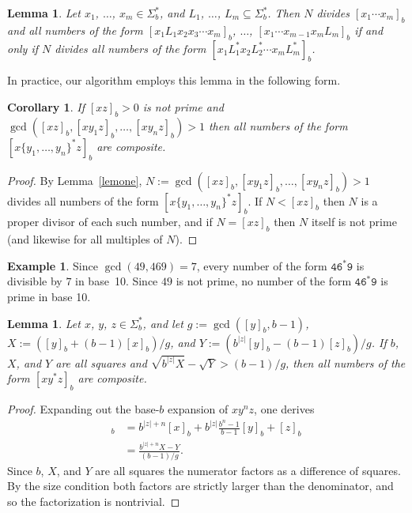 \documentclass[12pt]{article}
\theoremstyle{plain}
\newtheorem{corollary}[theorem]{Corollary}
\newtheorem{lemma}[theorem]{Lemma}
\theoremstyle{definition}
\newtheorem{example}[theorem]{Example}
\theoremstyle{remark}
\newcommand{\0}{\mathtt{0}}
\newcommand{\1}{\mathtt{1}}
\newcommand{\2}{\mathtt{2}}
\newcommand{\3}{\mathtt{3}}
\newcommand{\4}{\mathtt{4}}
\newcommand{\5}{\mathtt{5}}
\newcommand{\6}{\mathtt{6}}
\newcommand{\7}{\mathtt{7}}
\newcommand{\8}{\mathtt{8}}
\newcommand{\9}{\mathtt{9}}
\begin{document}
\begin{lemma}\label{lemtwo}
Let $x_1$, $\dotsc$, $x_m\in \Sigma^*_b$, and $L_1$, $\dotsc$, $L_m\subseteq\Sigma^*_b$.
Then $N$ divides $[x_1\dotsm x_m]_b$ and all numbers of the form $[x_1L_1x_2x_3\dotsm x_m]_b$, $\dotsc$, $[x_1\dotsm x_{m-1}x_mL_m]_b$
if and only if $N$ divides all numbers of the form $[x_1L_1^*x_2L_2^*\dotsm x_mL_m^*]_b$.
\end{lemma}

In practice, our algorithm employs this lemma in the following form.
\begin{corollary}
If $[xz]_b>0$ is not prime and $\gcd([xz]_b,[xy_1z]_b,\dotsc,[xy_nz]_b)>1$
 then all numbers of the form $[x\{y_1,\dotsc,y_n\}^*z]_b$ are composite.
\end{corollary}
\begin{proof}
By Lemma~\ref{lemone}, $N:=\gcd([xz]_b,[xy_1z]_b,\dotsc,[xy_nz]_b)>1$ divides all numbers of the form $[x\{y_1,\dotsc,y_n\}^*z]_b$.
If $N<[xz]_b$ then $N$ is a proper divisor of each such number, and if 
$N=[xz]_b$ then $N$ itself is not prime (and likewise for all multiples of $N$).
\end{proof}

\begin{example}
Since $\gcd(49, 469)=7$, every number of the form $\4\6^*\9$ is divisible 
by $7$ in base~10.  Since $49$ is not prime, no number of the form 
$\4\6^*\9$ is prime in base 10.
\end{example}

\begin{lemma}
Let $x$, $y$, $z\in\Sigma^*_b$, and let $g:=\gcd([y]_b,b-1)$, 
$X:=([y]_b+(b-1)[x]_b)/g$, and $Y:=(b^{\lvert{z}\rvert}[y]_b-(b-1)[z]_b)/g$.
If $b$, $X$, and $Y$ are all squares and 
$\sqrt{b^{\lvert z\rvert}X}-\sqrt{Y}>(b-1)/g$, then all numbers of the form
 $[xy^*z]_b$ are composite.
\end{lemma}
\begin{proof}
Expanding out the base-$b$ expansion of $xy^nz$, one derives
\begin{align*}
[xy^nz]_b &= b^{\lvert z\rvert+n}[x]_b + b^{\lvert z\rvert}\frac{b^n-1}{b-1}[y]_b + [z]_b \\
&= \frac{b^{\lvert z\rvert+n}X-Y}{(b-1)/g} . 
\end{align*}
Since $b$, $X$, and $Y$ are all squares the numerator factors as a 
difference of squares.  By the size condition both factors are 
strictly larger than the
denominator, and so the factorization is nontrivial.
\end{proof}
\end{document}
